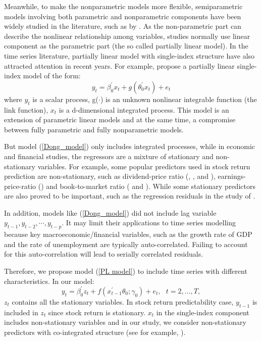 \documentclass[a4paper,12pt,times,numbered,print,index]{report}
\numberwithin{equation}{section}
\begin{document}
Meanwhile, to make the nonparametric models more flexible, semiparametric models involving both parametric and nonparametric components have been widely studied in the literature, such as by \cite{gao2007nonlinear}. As the non-parametric part can describe the nonlinear relationship among variables, studies normally use linear component as the parametric part (the so called partially linear model). In the time series literature, partially linear model with single-index structure have also attracted attention in recent years. For example, \cite{dong2016estimation} propose a partially linear single-index model of the form:
\begin{equation}
    y_t = \beta_0^{\prime}x_t+g(\theta_0^{\prime} x_t) + e_t
    \label{Dong_model}
\end{equation}
where $y_t$ is a scalar process, g($\cdot$) is an unknown nonlinear integrable function (the link function), $x_t$ is a d-dimensional integrated process. This model is an extension of parametric linear models and at the same time, a compromise between fully parametric and fully nonparametric models. 

But model (\ref{Dong_model}) only includes integrated processes, while in economic and financial studies, the regressors are a mixture of stationary and non-stationary variables. For example, some popular predictors used in stock return prediction are non-stationary, such as dividend-price ratio (\cite{fama1989business}, \cite{cochrane2008dog}, and \cite{lettau2008reconciling}), earnings-price-ratio (\cite{campbell1988stock}) and book-to-market ratio (\cite{kothari1997book} and \cite{pontiff1998book}). While some stationary predictors are also proved to be important, such as the regression residuals in the study of \cite{lettau2001consumption}. 

In addition, models like (\ref{Dong_model}) did not include lag variable $y_{t-1}, y_{t-2}, \cdots, y_{t-p}$. It may limit their applications to time series modelling because key macroeconomic/financial variables, such as the growth rate of GDP and the rate of unemployment are typically auto-correlated. Failing to account for this auto-correlation will lead to serially correlated residuals. 

Therefore, we propose model (\ref{PL model}) to include time series with different characteristics. In our model:
$$
y_{t} = \beta_0^{\prime} z_t + f\left( x_{t-1}^{\prime }\theta_0; \gamma_0\right) +e_{t},\ \ \
	t=2,...,T,
$$
$z_t$ contains all the stationary variables. In stock return predictability case, $y_{t-1}$ is included in $z_t$ since stock return is stationary. $x_t$ in the single-index component includes non-stationary variables and in our study, we consider non-stationary predictors with co-integrated structure (see for example, \cite{zhou2018semiparametric}). 
\end{document}
